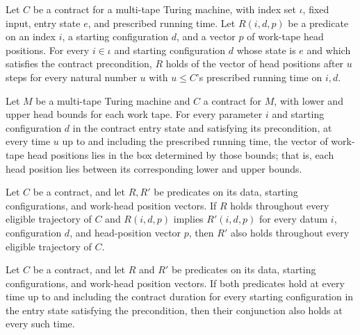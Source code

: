 \begin{definition}
\label{Turing.Contract.Traj}
\leanok
{}
Let $C$ be a contract for a multi-tape Turing machine, with index set $\iota$, fixed
input, entry state $e$, and prescribed running time. Let $R(i,d,p)$ be a predicate on an
index $i$, a starting configuration $d$, and a vector $p$ of work-tape head positions.
For every $i\in\iota$ and starting configuration $d$ whose state is $e$ and which
satisfies the contract precondition, $R$ holds of the vector of head positions after $u$
steps for every natural number $u$ with $u\leq C$’s prescribed running time on $i,d$.
\end{definition}

\begin{theorem}
\label{Turing.Contract.traj_env}
\leanok
{}
Let $M$ be a multi-tape Turing machine and $C$ a contract for $M$, with lower and upper
head bounds for each work tape. For every parameter $i$ and starting configuration $d$
in the contract entry state and satisfying its precondition, at every time $u$ up to and
including the prescribed running time, the vector of work-tape head positions lies in
the box determined by those bounds; that is, each head position lies between its
corresponding lower and upper bounds.
\end{theorem}

\begin{theorem}
\label{Turing.Contract.Traj.mono}
\leanok
{}
Let $C$ be a contract, and let $R,R'$ be predicates on its data, starting
configurations, and work-head position vectors. If $R$ holds throughout every eligible
trajectory of $C$ and $R(i,d,p)$ implies $R'(i,d,p)$ for every datum $i$, configuration
$d$, and head-position vector $p$, then $R'$ also holds throughout every eligible
trajectory of $C$.
\end{theorem}

\begin{theorem}
\label{Turing.Contract.Traj.and}
\leanok
{}
Let $C$ be a contract, and let $R$ and $R'$ be predicates on its data, starting
configurations, and work-head position vectors. If both predicates hold at every time up
to and including the contract duration for every starting configuration in the entry
state satisfying the precondition, then their conjunction also holds at every such time.
\end{theorem}

